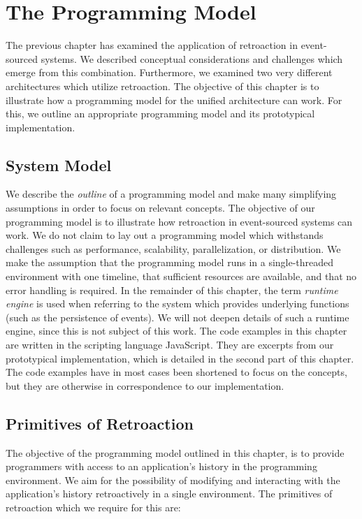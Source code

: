 \chapter{The Programming Model}
\label{chp:programming}

The previous chapter has examined the application of retroaction in 
event-sourced systems. We described conceptual considerations and challenges 
which emerge from this combination. Furthermore, we examined two very 
different architectures which utilize retroaction. The objective of this 
chapter is to illustrate how a programming model for the unified architecture 
can work. For this, we outline an appropriate programming model and its 
prototypical implementation.

\section{System Model}
We describe the \emph{outline} of a programming model and make many simplifying 
assumptions in order to focus on relevant concepts. 
The objective of our programming model is to illustrate how retroaction in 
event-sourced systems can work. We do not claim to lay out a programming model 
which withstands challenges such as performance, scalability, parallelization, 
or distribution.
We make the assumption that the programming model runs in a single-threaded 
environment with one timeline, that sufficient resources are available, and
that no error handling is required.
In the remainder of this chapter, the term \emph{runtime engine} is used when 
referring to the system which provides underlying functions (such as the 
persistence of events). We will not deepen details of such a runtime engine, 
since this is not subject of this work. The code examples in this chapter are 
written in the scripting language JavaScript. They are excerpts from our 
prototypical implementation, which is detailed in the second part of this 
chapter. The code examples have in most cases been shortened to focus on the 
concepts, but they are otherwise in correspondence to our implementation.

\section{Primitives of Retroaction}
The objective of the programming model outlined in this chapter, is to provide 
programmers with access to an application's history in the programming 
environment. We aim for the possibility of modifying and interacting with the 
application's history retroactively in a single environment.
The primitives of retroaction which we require for this are:
 
